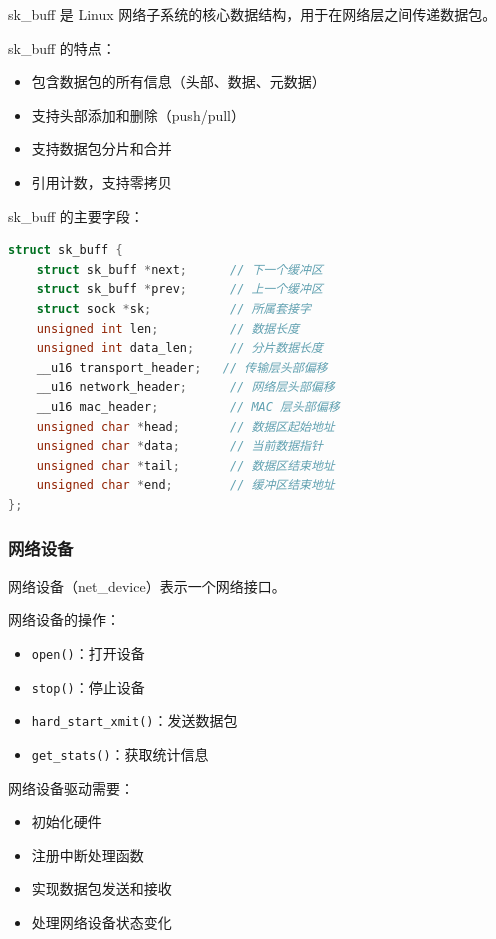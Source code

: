 
sk\_buff 是 Linux 网络子系统的核心数据结构，用于在网络层之间传递数据包。

sk\_buff 的特点：
\begin{itemize}
  \item 包含数据包的所有信息（头部、数据、元数据）
  \item 支持头部添加和删除（push/pull）
  \item 支持数据包分片和合并
  \item 引用计数，支持零拷贝
\end{itemize}

sk\_buff 的主要字段：
\begin{lstlisting}[language=C]
struct sk_buff {
    struct sk_buff *next;      // 下一个缓冲区
    struct sk_buff *prev;      // 上一个缓冲区
    struct sock *sk;           // 所属套接字
    unsigned int len;          // 数据长度
    unsigned int data_len;     // 分片数据长度
    __u16 transport_header;   // 传输层头部偏移
    __u16 network_header;      // 网络层头部偏移
    __u16 mac_header;          // MAC 层头部偏移
    unsigned char *head;       // 数据区起始地址
    unsigned char *data;       // 当前数据指针
    unsigned char *tail;       // 数据区结束地址
    unsigned char *end;        // 缓冲区结束地址
};
\end{lstlisting}

\subsubsection{网络设备}

网络设备（net\_device）表示一个网络接口。

网络设备的操作：
\begin{itemize}
  \item \texttt{open()}：打开设备
  \item \texttt{stop()}：停止设备
  \item \texttt{hard\_start\_xmit()}：发送数据包
  \item \texttt{get\_stats()}：获取统计信息
\end{itemize}

网络设备驱动需要：
\begin{itemize}
  \item 初始化硬件
  \item 注册中断处理函数
  \item 实现数据包发送和接收
  \item 处理网络设备状态变化
\end{itemize}

